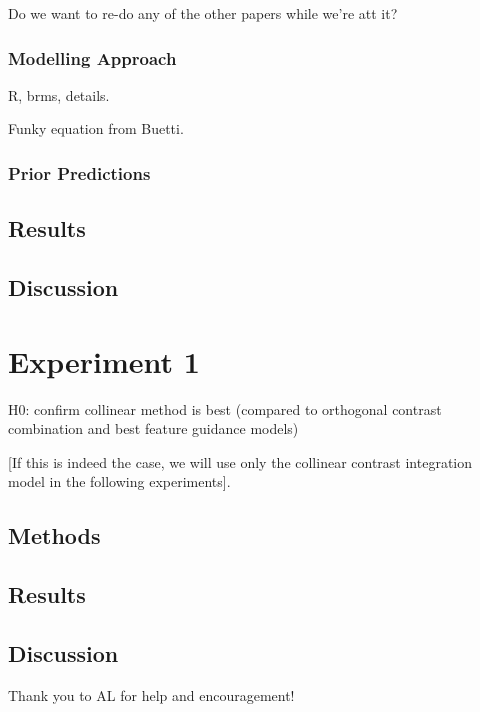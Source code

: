 Do we want to re-do any of the other papers while we're att it?

\subsubsection{Modelling Approach}

R, brms, details.

Funky equation from Buetti. 

\subsubsection{Prior Predictions}

\subsection{Results}

\subsection{Discussion}


\section{Experiment 1}

H0: confirm collinear method is best (compared to orthogonal contrast combination and best feature guidance models)

[If this is indeed the case, we will use only the collinear contrast integration model in the following experiments].

\subsection{Methods}

\subsection{Results}

\subsection{Discussion}



\begin{acknowledgements}
Thank you to AL for help and encouragement! 
\end{acknowledgements}



